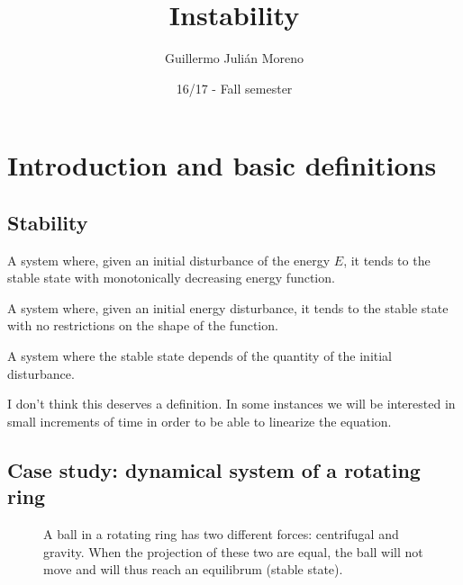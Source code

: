 \documentclass[palatino]{epflnotes}
\title{Instability}
\author{Guillermo Julián Moreno}
\date{16/17 - Fall semester}
\begin{document}
\frontmatter
\pagestyle{plain}
\maketitle

\tableofcontents
\mainmatter

\chapter{Introduction and basic definitions}

\section{Stability}

\begin{defn} A system where, given an initial disturbance of the energy $E$, it tends to the stable state with monotonically decreasing energy function.
\end{defn}

\begin{defn} A system where, given an initial energy disturbance, it tends to the stable state with no restrictions on the shape of the function.
\end{defn}

\begin{defn} A system where the stable state depends of the quantity of the initial disturbance.
\end{defn}

\begin{defn} I don't think this deserves a definition. In some instances we will be interested in small increments of time in order to be able to linearize the equation.
\end{defn}

\section{Case study: dynamical system of a rotating ring}

\begin{figure}[hbtp]
\centering
{}
\caption{A ball in a rotating ring has two different forces: centrifugal and gravity. When the projection of these two are equal, the ball will not move and will thus reach an equilibrum (stable state).}
\label{fig:Introduction:RotatingRing}
\end{figure}
\end{document}
